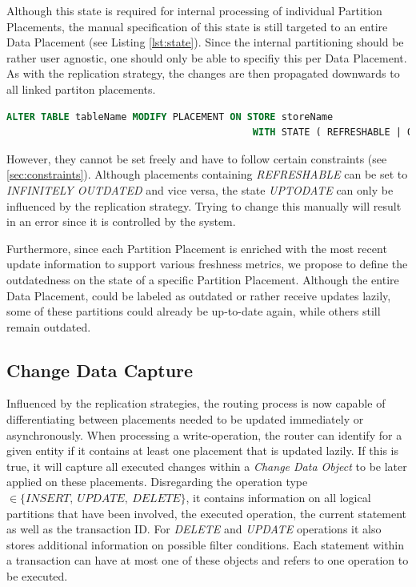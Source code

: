 Although this state is required for internal processing of individual Partition Placements, the manual specification of this state is still 
targeted to an entire Data Placement (see Listing \ref{lst:state}).
Since the internal partitioning should be rather user agnostic, one should only be able to specifiy this per Data Placement. 
As with the replication strategy, the changes are then propagated downwards to all linked partiton placements.

\begin{lstlisting}[language=sql, caption={SQL Statement Syntax to change the designated Replication State of Data Placement.},label={lst:state}]
    ALTER TABLE tableName MODIFY PLACEMENT ON STORE storeName 
                                           WITH STATE ( REFRESHABLE | OUTDATED );
\end{lstlisting}

However, they cannot be set freely and have to follow certain constraints (see \ref{sec:constraints}).
Although placements containing \emph{REFRESHABLE} can be set to \emph{INFINITELY OUTDATED} and vice versa, the state \emph{UPTODATE} can only be influenced by the replication strategy.
Trying to change this manually will result in an error since it is controlled by the system.



Furthermore, since each Partition Placement is enriched with the most recent update information to support various freshness metrics,
we propose to define the outdatedness on the state of a specific Partition Placement.
Although the entire Data Placement, could be labeled as outdated or rather receive updates lazily, some of 
these partitions could already be up-to-date again, while others still remain outdated.



\subsection{Change Data Capture}
\label{sec:cdc_impl}

Influenced by the replication strategies, the routing process is now capable of differentiating between placements needed to be updated immediately or asynchronously. 
When processing a write-operation, the router can identify for a given entity if it contains at least one placement that is updated lazily.
If this is true, it will capture all executed changes within a \emph{Change Data Object} to be later applied on these placements. 
Disregarding the operation type $\in \{INSERT,\:UPDATE,\:DELETE\}$, it contains information on all logical partitions that have been involved, 
the executed operation, the current statement as well as the transaction ID. For \emph{DELETE} and \emph{UPDATE} operations it also stores additional information on possible filter 
conditions. Each statement within a transaction can have at most one of these objects and refers to one operation to be executed.

